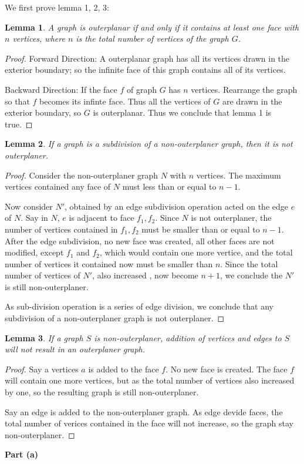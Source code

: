 \documentclass{article}
\newtheorem{lemma}{Lemma}
\begin{document}
We first prove lemma 1, 2, 3:
\begin{lemma}
	A graph is outerplanar if and only if it contains at least one face with $n$ vertices, where $n$ is the total number of vertices of the graph $G$.
\end{lemma}

\begin{proof}
Forward Direction:
A outerplanar graph has all its vertices drawn in the exterior boundary; so the infinite face of this graph contains all of its vertices.

Backward Direction:
If the face $f$ of graph $G$ has $n$ vertices. Rearrange the graph so that $f$ becomes its infinte face. Thus all the vertices of $G$ are drawn in the exterior boundary, so $G$ is outerplanar.
Thus we conclude that lemma 1 is true. 
\end{proof}

\begin{lemma}
	If a graph is a subdivision of a non-outerplaner graph, then it is not outerplaner.
\end{lemma}

\begin{proof}
Consider the non-outerplaner graph $N$ with $n$ vertices. The maximum vertices contained any face of $N$ must less than or equal to $n-1$.

Now consider $N'$, obtained by an edge subdivision operation acted on the edge $e$ of $N$. 
Say in $N$, $e$ is adjacent to face $f_1, f_2$. 
Since $N$ is not outerplaner, the number of vertices contained in $f_1, f_2$ must be smaller than or equal to $n-1$. 
After the edge subdivision, no new face was created, all other faces are not modified, except $f_1$ and $f_2$, which would contain one more vertice, and the total number of vertices it contained now must be smaller than $n$.
Since the total number of vertices of $N'$, also increased , now become $n+1$, we conclude the $N'$ is still non-outerplaner.

As sub-division operation is a series of edge division, we conclude that any subdivision of a non-outerplaner graph is not outerplaner.
\end{proof}

\begin{lemma}
	If a graph $S$ is non-outerplaner, addition of vertices and edges to $S$ will not result in an outerplaner graph.
\end{lemma}

\begin{proof}
Say a vertices $a$ is added to the face $f$. No new face is created. The face $f$ will contain one more vertices, but as the total number of vertices also increased by one, so the resulting graph is still non-outerplaner.

Say an edge is added to the non-outerplaner graph. As edge devide faces, the total number of verices contained in the face will not increase, so the graph stay non-outerplaner.
\end{proof}
\textbf{Part (a)}\\
\end{document}
